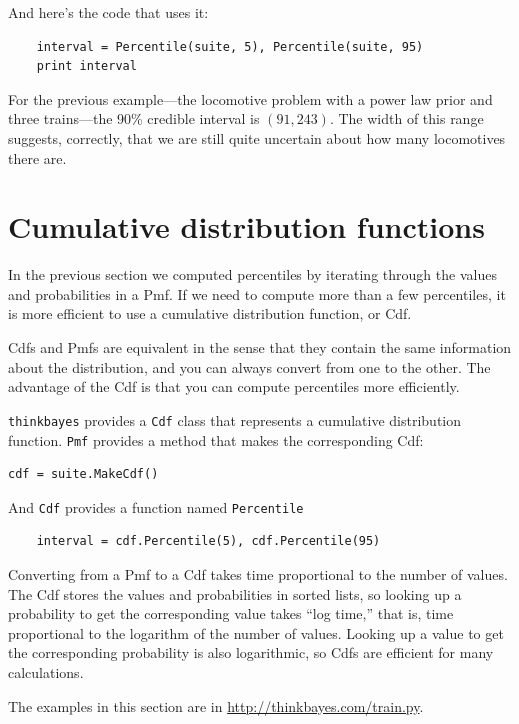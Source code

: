 \documentclass[12pt]{book}
\begin{document}
And here's the code that uses it:

\begin{verbatim}
    interval = Percentile(suite, 5), Percentile(suite, 95)
    print interval
\end{verbatim}

For the previous example---the locomotive problem with a power law prior
and three trains---the 90\% credible interval is $(91, 243)$.  The
width of this range suggests, correctly, that we are still quite
uncertain about how many locomotives there are.


\section{Cumulative distribution functions}

In the previous section we computed percentiles by iterating through
the values and probabilities in a Pmf.  If we need to compute more
than a few percentiles, it is more efficient to use a cumulative
distribution function, or Cdf.

Cdfs and Pmfs are equivalent in the sense that they contain the
same information about the distribution, and you can always convert
from one to the other.  The advantage of the Cdf is that you can
compute percentiles more efficiently.

{\tt thinkbayes} provides a {\tt Cdf} class that represents a
cumulative distribution function.  {\tt Pmf} provides a method
that makes the corresponding Cdf:

\begin{verbatim}
cdf = suite.MakeCdf()
\end{verbatim}

And {\tt Cdf} provides a function named \verb"Percentile"

\begin{verbatim}
    interval = cdf.Percentile(5), cdf.Percentile(95)
\end{verbatim}

Converting from a Pmf to a Cdf takes time proportional to the number
of values.  The Cdf stores the values and probabilities in sorted
lists, so looking up a probability to get the corresponding value
takes ``log time,'' that is, time proportional to the logarithm of the
number of values.  Looking up a value to get the corresponding
probability is also logarithmic, so Cdfs are efficient for many
calculations.

The examples in this section are in \url{http://thinkbayes.com/train.py}.
\end{document}
